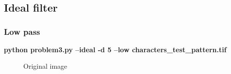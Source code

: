    \pagebreak
    \subsection{Ideal filter}

        \subsubsection{Low pass}

        \small{\textbf{python problem3.py --ideal -d 5 --low characters\_test\_pattern.tif}}

        \begin{figure}[!htb]\centering
            \begin{minipage}{0.40\textwidth}
                \caption{Original image}
            \end{minipage}
            \begin{minipage}{0.40\textwidth}

\end{minipage}
\end{figure}
